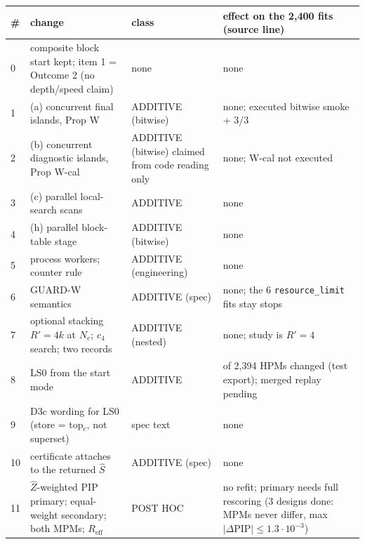 {\footnotesize
\begin{xltabular}{\linewidth}{@{}l>{\raggedright\arraybackslash}X>{\raggedright\arraybackslash}p{2.3cm}>{\raggedright\arraybackslash}X@{}}
\toprule
\# & change & class & effect on the 2,400 fits (source line)\\
\midrule{} & composite block start kept; item 1 = Outcome 2 (no depth/speed claim) & none & none \\
1 & (a) concurrent final islands, Prop W & ADDITIVE (bitwise) & none; executed bitwise smoke + 3/3 \\
2 & (b) concurrent diagnostic islands, Prop W-cal & ADDITIVE (bitwise) claimed from code reading only & none; W-cal not executed \\
3 & (c) parallel local-search scans & ADDITIVE & none \\
4 & (h) parallel block-table stage & ADDITIVE (bitwise) & none \\
5 & process workers; counter rule & ADDITIVE (engineering) & none \\
6 & GUARD-W semantics & ADDITIVE (spec) & none; the 6 \texttt{resource\_limit} fits stay stops \\
7 & optional stacking $R'=4k$ at $N_e$; $c_4$ search; two records & ADDITIVE (nested) & none; study is $R'=4$ \\
8 & LS0 from the start mode & ADDITIVE & 0 of 2,394 HPMs changed (test export); merged replay pending \\
9 & D3c wording for LS0 (store = top$_c$, not superset) & spec text & none \\
10 & certificate attaches to the returned $\hat S$ & ADDITIVE (spec) & none \\
11 & $\hat Z$-weighted PIP primary; equal-weight secondary; both MPMs; $R_{\mathrm{eff}}$ & POST HOC & no refit; primary needs full rescoring (3 designs done: MPMs never differ, max$|\Delta\mathrm{PIP}|\le1.3\cdot10^{-3}$) \\

\end{xltabular}}
